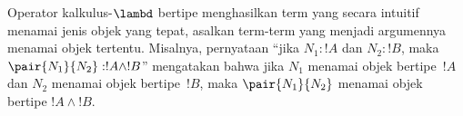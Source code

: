 \documentclass[../../../include/open-logic-section]{subfiles}
\begin{document}
Operator kalkulus-$\lambd$ bertipe menghasilkan term yang secara intuitif
menamai jenis objek yang tepat, asalkan term-term yang menjadi argumennya
menamai objek tertentu. Misalnya, pernyataan ``jika $N_1:!A$ dan $N_2:!B$,
maka $\pair{N_1}{N_2}:!A \land !B$'' mengatakan bahwa jika $N_1$ menamai
objek bertipe~$!A$ dan $N_2$ menamai objek bertipe~$!B$, maka
$\pair{N_1}{N_2}$ menamai objek bertipe $!A \land !B$.
\end{document}
